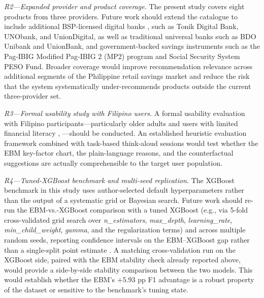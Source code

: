 \documentclass{icsthesis}
\begin{document}
\begin{mainmatter}
					\textit{R2---Expanded provider and product coverage.} The present study covers eight products from three providers. Future work should extend the catalogue to include additional BSP-licensed digital banks \cite{ref36}, \cite{ref38} such as Tonik Digital Bank, UNObank, and UnionDigital, as well as traditional universal banks such as BDO Unibank and UnionBank, and government-backed savings instruments such as the Pag-IBIG Modified Pag-IBIG 2 (MP2) program and Social Security System PESO Fund. Broader coverage would improve recommendation relevance across additional segments of the Philippine retail savings market and reduce the risk that the system systematically under-recommends products outside the current three-provider set.

					\textit{R3---Formal usability study with Filipino users.} A formal usability evaluation with Filipino participants---particularly older adults and users with limited financial literacy \cite{ref43}, \cite{ref76}---should be conducted. An established heuristic evaluation framework \cite{ref28} combined with task-based think-aloud sessions would test whether the EBM key-factor chart, the plain-language reasons, and the counterfactual suggestions are actually comprehensible to the target user population.

					\textit{R4---Tuned-XGBoost benchmark and multi-seed replication.} The XGBoost benchmark in this study uses author-selected default hyperparameters rather than the output of a systematic grid or Bayesian search. Future work should re-run the EBM-vs.-XGBoost comparison with a tuned XGBoost (e.g., via 5-fold cross-validated grid search over \emph{n\_estimators}, \emph{max\_depth}, \emph{learning\_rate}, \emph{min\_child\_weight}, \emph{gamma}, and the regularization terms) and across multiple random seeds, reporting confidence intervals on the EBM--XGBoost gap rather than a single-split point estimate \cite{ref68}. A matching cross-validation run on the XGBoost side, paired with the EBM stability check already reported above, would provide a side-by-side stability comparison between the two models. This would establish whether the EBM's $+5.93$ pp F1 advantage is a robust property of the dataset or sensitive to the benchmark's tuning state.


\end{mainmatter}
\end{document}
